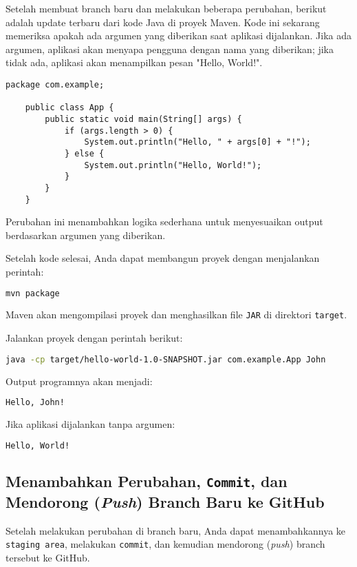 Setelah membuat branch baru dan melakukan beberapa perubahan, berikut adalah update terbaru dari kode Java di proyek Maven. Kode ini sekarang memeriksa apakah ada argumen yang diberikan saat aplikasi dijalankan. Jika ada argumen, aplikasi akan menyapa pengguna dengan nama yang diberikan; jika tidak ada, aplikasi akan menampilkan pesan "Hello, World!".

\begin{lstlisting}[style=java]
	package com.example;
	
	public class App {
		public static void main(String[] args) {
			if (args.length > 0) {
				System.out.println("Hello, " + args[0] + "!");
			} else {
				System.out.println("Hello, World!");
			}
		}
	}
\end{lstlisting}
Perubahan ini menambahkan logika sederhana untuk menyesuaikan output berdasarkan argumen yang diberikan. 

Setelah kode selesai, Anda dapat membangun proyek dengan menjalankan perintah:
\begin{lstlisting}[language=bash]
	mvn package
\end{lstlisting}
Maven akan mengompilasi proyek dan menghasilkan file \texttt{JAR} di direktori \texttt{target}.

Jalankan proyek dengan perintah berikut:
\begin{lstlisting}[language=bash]
	java -cp target/hello-world-1.0-SNAPSHOT.jar com.example.App John
\end{lstlisting}

Output programnya akan menjadi:

\begin{lstlisting}[language=bash]
	Hello, John!
\end{lstlisting}

Jika aplikasi dijalankan tanpa argumen:

\begin{lstlisting}[language=bash]
	Hello, World!
\end{lstlisting}


\subsection{Menambahkan Perubahan, \texttt{Commit}, dan Mendorong (\textit{Push}) Branch Baru ke GitHub}

Setelah melakukan perubahan di branch baru, Anda dapat menambahkannya ke \texttt{staging area}, melakukan \texttt{commit}, dan kemudian mendorong (\textit{push}) branch tersebut ke GitHub.

